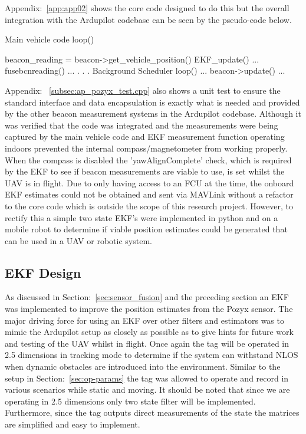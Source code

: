 Appendix:~\ref{app:app02} shows the core code designed to do this but the overall integration with the Ardupilot codebase can be seen by the pseudo-code below.
\begin{algorithm}
    Main vehicle code
        loop()
        {
            beacon_reading = beacon->get_vehicle_position()
            EKF_update()
            {
                ...
                fusebcnreading()
                ...
            }
            .
            .
            .
    Background Scheduler
        loop()
        {
            ...
            beacon->update()
            ...
        }

        }
\end{algorithm}

Appendix: ~\ref{subsec:ap_pozyx_test.cpp} also shows a unit test to ensure the standard interface and data encapsulation is exactly what is needed and provided by the other beacon measurement systems in the Ardupilot codebase.
Although it was verified that the code was integrated and the measurements were being captured by the main vehicle code and EKF measurement function operating indoors prevented the internal compass/magnetometer from working properly.
When the compass is disabled the 'yawAlignComplete' check, which is required by the EKF to see if beacon measurements are viable to use, is set whilst the UAV is in flight.
Due to only having access to an FCU at the time, the onboard EKF estimates could not be obtained and sent via MAVLink without a refactor to the core code which is outside the scope of this research project.
However, to rectify this a simple two state EKF's were implemented in python and on a mobile robot to determine if viable position estimates could be generated that can be used in a UAV or robotic system.

\subsection*{EKF Design}
As discussed in Section:~\ref{sec:sensor_fusion} and the preceding section an EKF was implemented to improve the position estimates from the Pozyx sensor.
The major driving force for using an EKF over other filters and estimators was to mimic the Ardupilot setup as closely as possible as to give hints for future work and testing of the UAV whilst in flight.
Once again the tag will be operated in 2.5 dimensions in tracking mode to determine if the system can withstand NLOS when dynamic obstacles are introduced into the environment.
Similar to the setup in Section:~\ref{sec:op-params} the tag was allowed to operate and record in various scenarios while static and moving.
It should be noted that since we are operating in 2.5 dimensions only two state filter will be implemented.
Furthermore, since the tag outputs direct measurements of the state the matrices are simplified and easy to implement.

